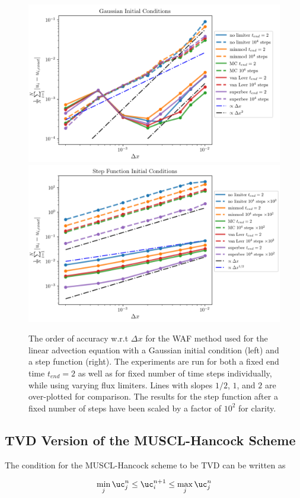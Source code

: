 \begin{figure}
    \centering
\includegraphics[width=.49\textwidth]{figures/FV/advection_WAF/accuracy_dx-gaussian.png}%
\includegraphics[width=.49\textwidth]{figures/FV/advection_WAF/accuracy_dx-step.png}
    \caption[Order of Accuracy w.r.t. $\Delta x$ for the WAF scheme.]{
The order of accuracy w.r.t $\Delta x$ for the WAF method used for the linear advection equation
with a Gaussian initial condition (left) and a step function (right). The experiments are run for
both a fixed end time $t_{end} = 2$ as well as for fixed number of time steps individually, while
using varying flux limiters. Lines with slopes $1/2$, $1$, and $2$ are over-plotted for comparison.
The results for the step function after a fixed number of steps have been scaled by a factor of
$10^2$ for clarity.
    }
    \label{fig:advection-WAF-accuracy-dx}
\end{figure}











\subsection{TVD Version of the MUSCL-Hancock Scheme}\label{chap:muscl-hancock-advection-tvd}


The condition for the MUSCL-Hancock scheme to be TVD can be written as

\begin{align}
    \min_j{\uc_j^n} \leq \uc_i^{n+1} \leq \max_j {\uc_j^n}
\end{align}

